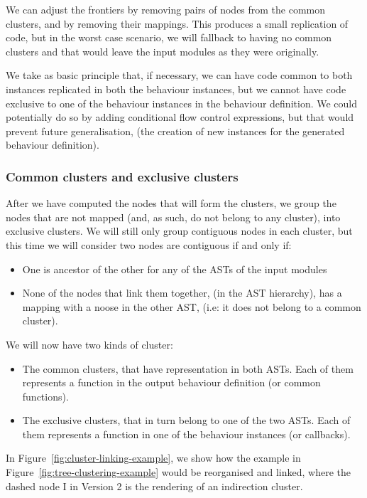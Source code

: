 We can adjust the frontiers by removing pairs of nodes from the common
clusters, and by removing their mappings. This produces a small replication
of code, but in the worst case scenario, we will fallback to having
no common clusters and that would leave the input modules as they
were originally.

We take as basic principle that, if necessary, we can have code common
to both instances replicated in both the behaviour instances, but
we cannot have code exclusive to one of the behaviour instances in
the behaviour definition. We could potentially do so by adding conditional
flow control expressions, but that would prevent future generalisation,
(the creation of new instances for the generated behaviour definition).


\subsubsection{Common clusters and exclusive clusters}

After we have computed the nodes that will form the clusters, we group
the nodes that are not mapped (and, as such, do not belong to any
cluster), into exclusive clusters. We will still only group contiguous
nodes in each cluster, but this time we will consider two nodes are
contiguous if and only if:
\begin{itemize}
\item One is ancestor of the other for any of the ASTs of the input modules
\item None of the nodes that link them together, (in the AST hierarchy),
has a mapping with a noose in the other AST, (i.e: it does not belong
to a common cluster).
\end{itemize}
We will now have two kinds of cluster:
\begin{itemize}
\item The common clusters, that have representation in both ASTs. Each of
them represents a function in the output behaviour definition (or
common functions).
\item The exclusive clusters, that in turn belong to one of the two ASTs.
Each of them represents a function in one of the behaviour instances
(or callbacks).
\end{itemize}
In Figure~\ref{fig:cluster-linking-example}, we show how the example
in Figure~\ref{fig:tree-clustering-example} would be reorganised
and linked, where the dashed node I in Version 2 is the rendering
of an indirection cluster.

